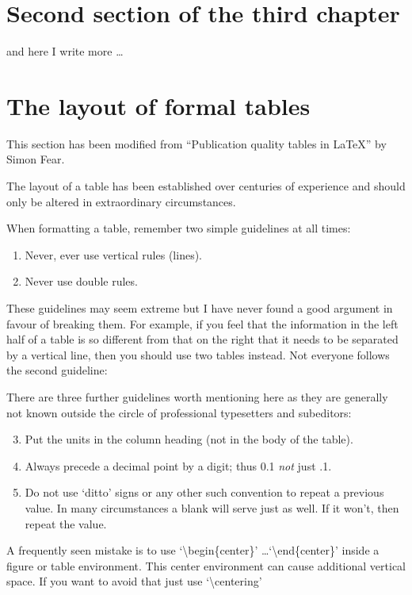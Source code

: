 \section{Second section of the third chapter}
and here I write more \dots

\section{The layout of formal tables}
This section has been modified from ``Publication quality tables in \LaTeX*''
 by Simon Fear.

The layout of a table has been established over centuries of experience and 
should only be altered in extraordinary circumstances. 

When formatting a table, remember two simple guidelines at all times:

\begin{enumerate}
  \item Never, ever use vertical rules (lines).
  \item Never use double rules.
\end{enumerate}

These guidelines may seem extreme but I have
never found a good argument in favour of breaking them. For
example, if you feel that the information in the left half of
a table is so different from that on the right that it needs
to be separated by a vertical line, then you should use two
tables instead. Not everyone follows the second guideline:

There are three further guidelines worth mentioning here as they
are generally not known outside the circle of professional
typesetters and subeditors:

\begin{enumerate}\setcounter{enumi}{2}
  \item Put the units in the column heading (not in the body of
          the table).
  \item Always precede a decimal point by a digit; thus 0.1
      {\em not} just .1.
  \item Do not use `ditto' signs or any other such convention to
      repeat a previous value. In many circumstances a blank
      will serve just as well. If it won't, then repeat the value.
\end{enumerate}

A frequently seen mistake is to use `\textbackslash begin\{center\}' \dots `\textbackslash end\{center\}' inside a figure or table environment. This center environment can cause additional vertical space. If you want to avoid that just use `\textbackslash centering'


